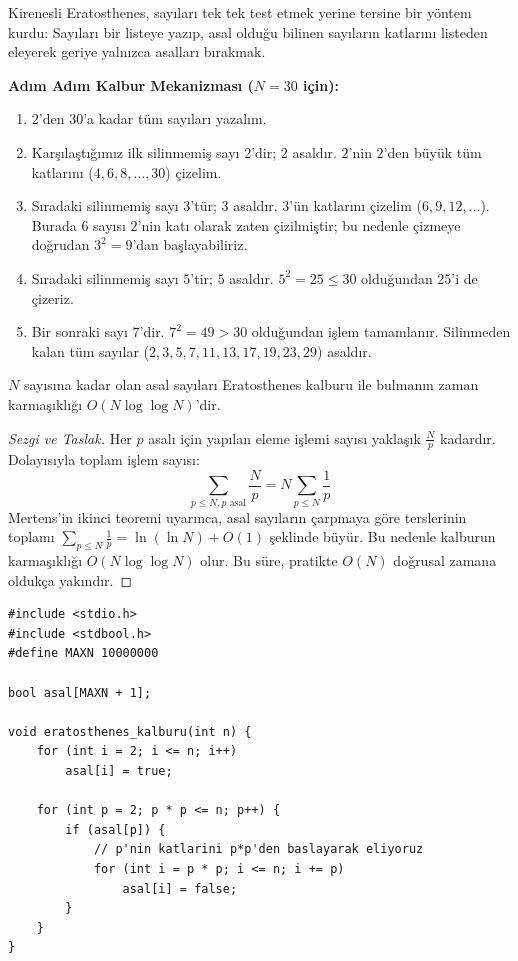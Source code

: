 Kirenesli Eratosthenes, sayıları tek tek test etmek yerine tersine bir yöntem kurdu: Sayıları bir listeye yazıp, asal olduğu bilinen sayıların katlarını listeden eleyerek geriye yalnızca asalları bırakmak.

\textbf{Adım Adım Kalbur Mekanizması ($N = 30$ için):}
\begin{enumerate}
    \item $2$'den $30$'a kadar tüm sayıları yazalım.
    \item Karşılaştığımız ilk silinmemiş sayı $2$'dir; $2$ asaldır. $2$'nin $2$'den büyük tüm katlarını ($4, 6, 8, \dots, 30$) çizelim.
    \item Sıradaki silinmemiş sayı $3$'tür; $3$ asaldır. $3$'ün katlarını çizelim ($6, 9, 12, \dots$). Burada $6$ sayısı $2$'nin katı olarak zaten çizilmiştir; bu nedenle çizmeye doğrudan $3^2 = 9$'dan başlayabiliriz.
    \item Sıradaki silinmemiş sayı $5$'tir; $5$ asaldır. $5^2 = 25 \le 30$ olduğundan $25$'i de çizeriz.
    \item Bir sonraki sayı $7$'dir. $7^2 = 49 > 30$ olduğundan işlem tamamlanır. Silinmeden kalan tüm sayılar ($2, 3, 5, 7, 11, 13, 17, 19, 23, 29$) asaldır.
\end{enumerate}

\begin{theorem}
$N$ sayısına kadar olan asal sayıları Eratosthenes kalburu ile bulmanın zaman karmaşıklığı $O(N \log \log N)$'dir.
\end{theorem}
\begin{proof}[Sezgi ve Taslak]
Her $p$ asalı için yapılan eleme işlemi sayısı yaklaşık $\frac{N}{p}$ kadardır. Dolayısıyla toplam işlem sayısı:
\[ \sum_{p \le N, p \text{ asal}} \frac{N}{p} = N \sum_{p \le N} \frac{1}{p} \]
Mertens'in ikinci teoremi uyarınca, asal sayıların çarpmaya göre terslerinin toplamı $\sum_{p \le N} \frac{1}{p} = \ln(\ln N) + O(1)$ şeklinde büyür. Bu nedenle kalburun karmaşıklığı $O(N \log \log N)$ olur. Bu süre, pratikte $O(N)$ doğrusal zamana oldukça yakındır.
\end{proof}

\begin{lstlisting}[language=CTemel]
#include <stdio.h>
#include <stdbool.h>
#define MAXN 10000000

bool asal[MAXN + 1];

void eratosthenes_kalburu(int n) {
    for (int i = 2; i <= n; i++)
        asal[i] = true;
        
    for (int p = 2; p * p <= n; p++) {
        if (asal[p]) {
            // p'nin katlarini p*p'den baslayarak eliyoruz
            for (int i = p * p; i <= n; i += p)
                asal[i] = false;
        }
    }
}
\end{lstlisting}

